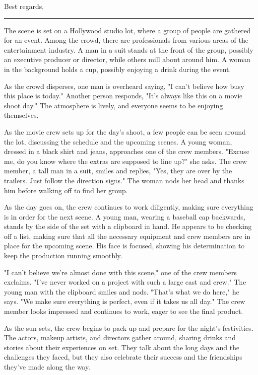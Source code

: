 \documentclass[smalldemyvopaper,11pt,twoside,onecolumn,openright,extrafontsizes]{memoir}
\begin{document}
Best regards,\par
[Your Name]\par
\fancybreak{* * *}
The scene is set on a Hollywood studio lot, where a group of people are gathered for an event. Among the crowd, there are professionals from various areas of the entertainment industry. A man in a suit stands at the front of the group, possibly an executive producer or director, while others mill about around him. A woman in the background holds a cup, possibly enjoying a drink during the event.\par
As the crowd disperses, one man is overheard saying, "I can't believe how busy this place is today." Another person responds, "It's always like this on a movie shoot day." The atmosphere is lively, and everyone seems to be enjoying themselves.\par
As the movie crew sets up for the day's shoot, a few people can be seen around the lot, discussing the schedule and the upcoming scenes. A young woman, dressed in a black shirt and jeans, approaches one of the crew members. "Excuse me, do you know where the extras are supposed to line up?" she asks. The crew member, a tall man in a suit, smiles and replies, "Yes, they are over by the trailers. Just follow the direction signs." The woman nods her head and thanks him before walking off to find her group.\par
As the day goes on, the crew continues to work diligently, making sure everything is in order for the next scene. A young man, wearing a baseball cap backwards, stands by the side of the set with a clipboard in hand. He appears to be checking off a list, making sure that all the necessary equipment and crew members are in place for the upcoming scene. His face is focused, showing his determination to keep the production running smoothly.\par
"I can't believe we're almost done with this scene," one of the crew members exclaims. "I've never worked on a project with such a large cast and crew." The young man with the clipboard smiles and nods. "That's what we do here," he says. "We make sure everything is perfect, even if it takes us all day." The crew member looks impressed and continues to work, eager to see the final product.\par
As the sun sets, the crew begins to pack up and prepare for the night's festivities. The actors, makeup artists, and directors gather around, sharing drinks and stories about their experiences on set. They talk about the long days and the challenges they faced, but they also celebrate their success and the friendships they've made along the way.\par
\end{document}
